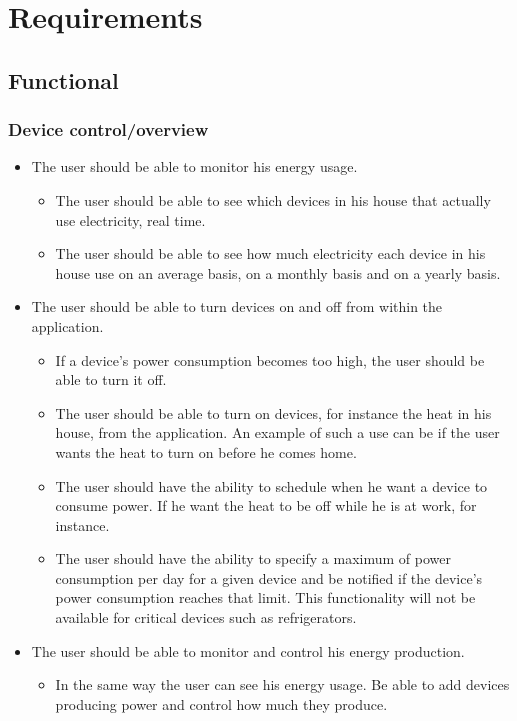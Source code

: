 \chapter{Requirements}
\section{Functional}

\subsection{Device control/overview}
\begin{itemize}
\item The user should be able to monitor his energy usage.
\begin{itemize}
\item The user should be able to see which devices in his house that actually use electricity, real time.
\item The user should be able to see how much electricity each device in his house use on an average basis, on a monthly basis and on a yearly basis.
\end{itemize}

\item The user should be able to turn devices on and off from within the application.
\begin{itemize}
\item If a device's power consumption becomes too high, the user should be able to turn it off.
\item The user should be able to turn on devices, for instance the heat in his house, from the application. An example of such a use can be if the user wants the heat to turn on before he comes home.
\item The user should have the ability to schedule when he want a device to consume power. If he want the heat to be off while he is at work, for instance. 
\item The user should have the ability to specify a maximum of power 
consumption per day for a given device and be notified if the device's power
consumption reaches that limit. This functionality will not be available
for critical devices such as refrigerators. 
\end{itemize}

\item The user should be able to monitor and control his energy production.
\begin{itemize}
\item In the same way the user can see his energy usage. Be able to add devices producing power and control how much they produce.
\end{itemize}
\end{itemize}

